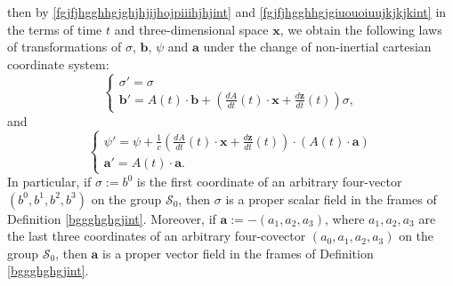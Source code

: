 \documentclass{article}
\theoremstyle{definition}
\theoremstyle{remark}
\renewcommand{\vec}[1]{\mathbf{#1}}
\newcommand{\er}{\eqref}
\newcommand{\er}{\eqref}
\begin{document}
then by \er{fgjfjhgghhgjghjhjijhojpiiihjhjint} and
\er{fgjfjhgghhgjgiuouoiuujkjkjkint} in the terms of time $t$ and
three-dimensional space $\vec x$, we obtain the following laws of
transformations of $\sigma$, $\vec b$, $\psi$ and $\vec a$ under the
change of non-inertial cartesian coordinate system:
\begin{equation}\label{fgjfjhgghhgjgiuouoiuujkjkjkojkoiuint}
\begin{cases}
\sigma'=\sigma
\\
\vec b'=A\left(t\right)\cdot\vec
b+\left(\frac{dA}{dt}\left(t\right)\cdot\vec x+\frac{d \vec
z}{dt}\left(t\right)\right)\sigma,
\end{cases}
\end{equation}
and
\begin{equation}\label{fgjfjhgghhgjghjhjijhojpiiihjhjuioujint}
\begin{cases}
\psi'=\psi+\frac{1}{c}\left(\frac{dA}{dt}\left(t\right)\cdot\vec
x+\frac{d \vec z}{dt}\left(t\right)\right)\cdot\left(A(t)\cdot\vec
a\right)
\\
\vec a'=A(t)\cdot\vec a.
\end{cases}
\end{equation}
In particular, if $\sigma:=b^0$ is the first coordinate of an
arbitrary four-vector $(b^0,b^1,b^2,b^3)$ on the group
$\mathcal{S}_0$, then $\sigma$ is a proper scalar field in the
frames of Definition \ref{bggghghgjint}. Moreover, if $\vec
a:=-(a_1,a_2,a_3)$, where $a_1,a_2,a_3$ are the last three
coordinates of an arbitrary four-covector $(a_0,a_1,a_2,a_3)$ on the
group $\mathcal{S}_0$, then $\vec a$ is a proper vector field in the
frames of Definition \ref{bggghghgjint}.
\end{document}
